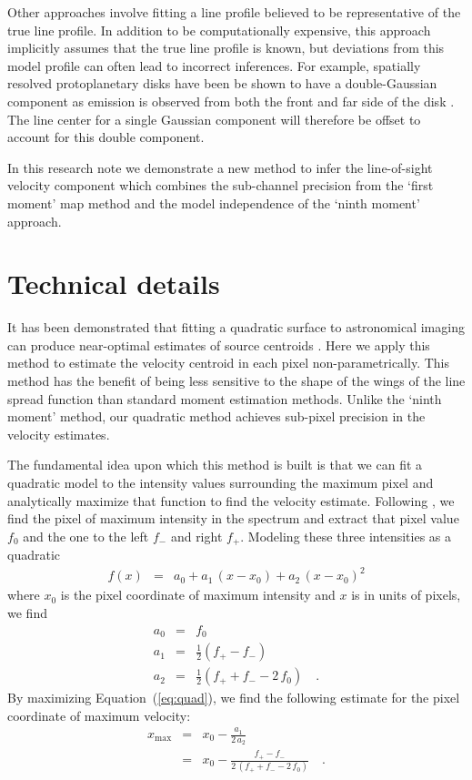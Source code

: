 \documentclass[rnaas]{aastex62}
\renewcommand{\eqref}[1]{\ref{eq:#1}}
\newcommand{\Eq}[1]{Equation~(\eqref{#1})}
\newcommand{\eqlabel}[1]{\label{eq:#1}}
\begin{document}
Other approaches involve fitting a line profile believed to be representative of the true line profile. In addition to be computationally expensive, this approach implicitly assumes that the true line profile is known, but deviations from this model profile can often lead to incorrect inferences. For example, spatially resolved protoplanetary disks have been be shown to have a double-Gaussian component as emission is observed from both the front and far side of the disk \citep{Rosenfeld:2013}. The line center for a single Gaussian component will therefore be offset to account for this double component.


In this research note we demonstrate a new method to infer the line-of-sight velocity component which combines the sub-channel precision from the `first moment' map method and the model independence of the `ninth moment' approach.

\section{Technical details}

It has been demonstrated that fitting a quadratic surface to astronomical
imaging can produce near-optimal estimates of source centroids
\citep{Vakili:2016}.
Here we apply this method to estimate the velocity centroid in each pixel
non-parametrically.
This method has the benefit of being less sensitive to the shape of the wings
of the line spread function than standard moment estimation methods.
Unlike the `ninth moment' method, our quadratic method achieves sub-pixel
precision in the velocity estimates.

The fundamental idea upon which this method is built is that we can fit a
quadratic model to the intensity values surrounding the maximum pixel and
analytically maximize that function to find the velocity estimate.
Following \citet{Vakili:2016}, we find the pixel of maximum intensity in the
spectrum and extract that pixel value $f_0$ and the one to the left $f_-$ and
right $f_+$.
Modeling these three intensities as a quadratic
\begin{eqnarray}
f(x) &=& a_0 + a_1\,(x-x_0) + a_2\,{(x-x_0)}^2
\eqlabel{quad}
\end{eqnarray}
where $x_0$ is the pixel coordinate of maximum intensity and $x$ is in units
of pixels, we find
\begin{eqnarray}
a_0 &=& f_0 \\
a_1 &=& \frac{1}{2}(f_+ - f_-) \\
a_2 &=& \frac{1}{2}(f_+ + f_- - 2\,f_0) \quad.
\end{eqnarray}
By maximizing \Eq{quad}, we find the following estimate for the pixel
coordinate of maximum velocity:
\begin{eqnarray}
x_\mathrm{max} &=& x_0 - \frac{a_1}{2\,a_2} \\
    &=& x_0 - \frac{f_+ - f_-}{2\,(f_+ + f_- - 2\,f_0)} \quad.
\end{eqnarray}
\end{document}
